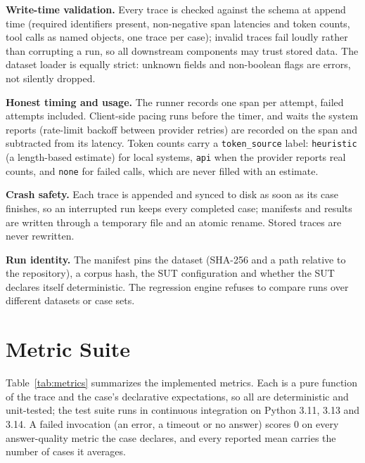 \documentclass[conference]{IEEEtran}
\begin{document}
\textbf{Write-time validation.} Every trace is checked against the schema
at append time (required identifiers present, non-negative span latencies
and token counts, tool calls as named objects, one trace per case);
invalid traces fail loudly rather than corrupting a run, so all downstream
components may trust stored data. The dataset loader is equally strict:
unknown fields and non-boolean flags are errors, not silently dropped.

\textbf{Honest timing and usage.} The runner records one span per attempt,
failed attempts included. Client-side pacing runs before the timer, and
waits the system reports (rate-limit backoff between provider retries) are
recorded on the span and subtracted from its latency. Token counts carry a
\texttt{token\_source} label: \texttt{heuristic} (a length-based estimate)
for local systems, \texttt{api} when the provider reports real counts, and
\texttt{none} for failed calls, which are never filled with an estimate.

\textbf{Crash safety.} Each trace is appended and synced to disk as soon as
its case finishes, so an interrupted run keeps every completed case;
manifests and results are written through a temporary file and an atomic
rename. Stored traces are never rewritten.

\textbf{Run identity.} The manifest pins the dataset (SHA-256 and a path
relative to the repository), a corpus hash, the SUT configuration and
whether the SUT declares itself deterministic. The regression engine
refuses to compare runs over different datasets or case sets.

\section{Metric Suite}
Table~\ref{tab:metrics} summarizes the implemented metrics. Each is a pure
function of the trace and the case's declarative expectations, so all are
deterministic and unit-tested; the test suite runs in continuous
integration on Python 3.11, 3.13 and 3.14. A failed invocation (an error,
a timeout or no answer) scores 0 on every answer-quality metric the case
declares, and every reported mean carries the number of cases it averages.
\end{document}
